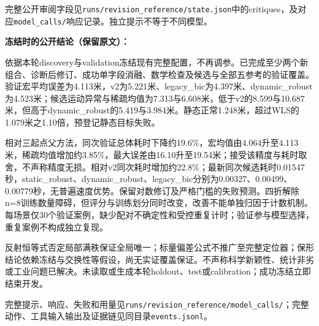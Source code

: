 完整公开审阅字段见\nolinkurl{runs/revision_reference/state.json}中的critiques，及对应\nolinkurl{model_calls/}响应记录。独立提示不等于不同模型。

\noindent\textbf{冻结时的公开结论（保留原文）：}

依据本轮discovery与validation冻结现有完整配置，不再调参。已完成至少两个新组合、诊断后修订、成功单字段消融、数学检查及候选与全部五参考的验证覆盖。验证宏平均误差为4.113米，v2为5.221米、legacy\_\allowbreak{}bic为4.397米、dynamic\_\allowbreak{}robust为4.523米；候选运动异常与稀疏均值为7.313与6.608米，低于v2的8.599与10.687米，但高于dynamic\_\allowbreak{}robust的5.419与3.984米。静态正常1.248米，超过WLS的1.079米之1.10倍，预登记静态目标失败。

相对三起点父方法，同次验证总体耗时下降约19.6\%，宏均值由4.064升至4.113米，稀疏均值增加约3.85\%，最大误差由16.10升至19.54米；接受该精度与耗时取舍，不声称精度无损。相对v2同次耗时增加约22.8\%；最新同次候选耗时0.01547秒，static\_\allowbreak{}robust、dynamic\_\allowbreak{}robust、legacy\_\allowbreak{}bic分别为0.00327、0.00499、0.00779秒，无普遍速度优势。保留对数修订及严格门槛的失败预测。四折解除n=8训练数量障碍，但评分与训练划分同时改变，改善不能单独归因于计数机制。每场景仅30个验证案例，缺少配对不确定性和受控重复计时；验证参与模型选择，重复案例不构成独立复现。

反射恒等式否定局部满秩保证全局唯一；标量偏差公式不推广至完整定位器；保形结论依赖冻结与交换性等假设，尚无实证覆盖保证。不声称科学新颖性、统计非劣或工业问题已解决。未读取或生成本轮holdout、test或calibration；成功冻结立即结束开发。

完整提示、响应、失败和用量见\nolinkurl{runs/revision_reference/model_calls/}；完整动作、工具输入输出及证据链见同目录\texttt{events.jsonl}。
